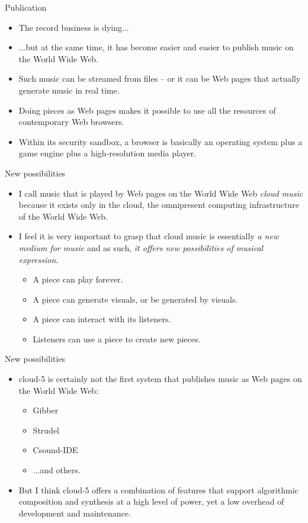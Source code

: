 \documentclass{beamer}
\begin{document}
\begin{frame}{Publication}
\begin{itemize}
\item The record business is dying...
\item ...but at the same time, it has become easier and easier to publish music on the World Wide Web.
\item Such music can be streamed from files -- or it can be Web pages that actually generate music in real time.
\item Doing pieces as Web pages makes it possible to use all the resources of contemporary Web browsers.
\item Within its security sandbox, a browser is basically an operating system plus a game engine plus a high-resolution media player.
\end{itemize}
\end{frame}

\begin{frame}{New possibilities}
\begin{itemize}
\item I call music that is played by Web pages on the World Wide Web \emph{cloud music} because it exists only in the cloud, the omnipresent computing infrastructure of the World Wide Web.
\item I feel it is very important to grasp that cloud music is essentially \emph{a new medium for music} and as such,\emph{ it offers new possibilities of musical expression}.
\begin{itemize}
\item A piece can play forever.
\item A piece can generate visuals, or be generated by visuals.
\item A piece can interact with its listeners.
\item Listeners can use a piece to create new pieces.
\end{itemize}
\end{itemize}
\end{frame}

\begin{frame}{New possibilities}
\begin{itemize}
\item cloud-5 is certainly not the first system that publishes music as Web pages on the World Wide Web:
\begin{itemize}
\item Gibber
\item Strudel
\item Csound-IDE
\item ...and others.
\end{itemize}
\item But I think cloud-5 offers a combination of features that support algorithmic composition and synthesis at a high level of power, yet a low overhead of development and maintenance.
\end{itemize}
\end{frame}
\end{document}
